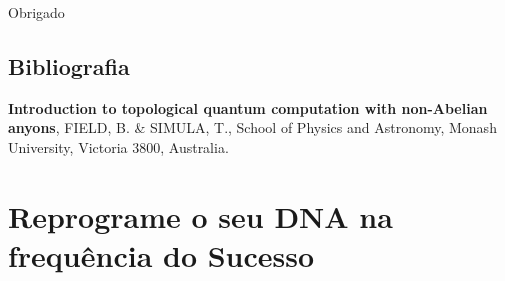 \documentclass[t]{beamer}
\begin{document}
	\begin{frame}
		Obrigado
	\end{frame}
	
	\subsection{Bibliografia}
	
	\begin{frame}{\subsecname}
		
		 \textbf{Introduction to topological quantum computation with non-Abelian anyons}, FIELD, B. \& SIMULA, T., School of Physics and Astronomy, Monash University, Victoria 3800, Australia.
		
		\bibitem{}
	\end{frame}
	
	\section*{Reprograme o seu DNA na frequência do Sucesso}
	
	\begin{frame}
	
	\end{frame}
\end{document}
